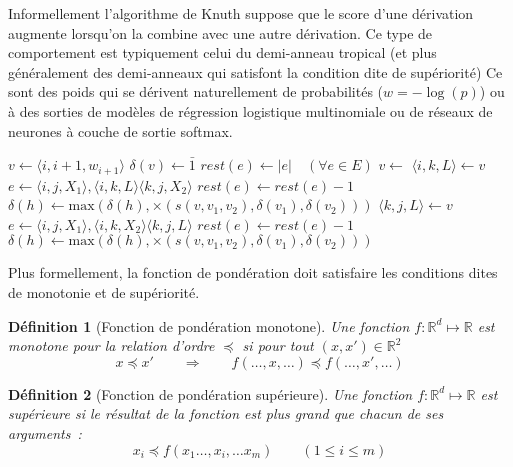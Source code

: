 \documentclass[11pt,openany]{book}
\newtheorem{definition}{Définition}[chapter]
\begin{document}
Informellement l'algorithme de Knuth suppose que le score d'une dérivation augmente lorsqu'on la combine avec une autre dérivation.
Ce type de comportement est typiquement celui du demi-anneau tropical (et plus généralement des demi-anneaux qui satisfont 
la condition dite de supériorité)
Ce sont des poids qui se dérivent naturellement de probabilités 
($w = -\log(p)$) ou à des sorties de modèles de régression logistique multinomiale ou de réseaux de neurones
à couche de sortie softmax.

\begin{algorithm}[htbp]
\begin{algorithmic}
\State $v \gets \langle i,i+1,w_{i+1} \rangle$
\State $\delta(v) \gets \bar{1}$
\State  {}
\EndFor
\State   $rest(e) \gets |e| \quad (\forall e \in E)$ 
\State $v \gets $ 
\State $\langle i , k , L \rangle \gets v$
\State $e \gets \langle i,j , X_1 \rangle , \langle i , k , L \rangle \langle k , j , X_2 \rangle$
\State $rest(e) \gets rest(e) - 1$
\State $\delta(h) \gets \text{max}( \delta(h),  \times(s(v,v_1,v_2),\delta(v_1),\delta(v_2)))$
\State {}
\EndIf
\EndFor
\EndFor
\State $\langle k , j , L \rangle \gets v$
\State $e \gets \langle i,j , X_1 \rangle , \langle i , k , X_2 \rangle \langle k , j , L \rangle$
\State $rest(e) \gets rest(e) - 1$
\State $\delta(h) \gets \text{max}( \delta(h),  \times(s(v,v_1,v_2),\delta(v_1),\delta(v_2)))$
\State {}
\EndIf
\EndFor
\EndFor
\EndWhile
\EndFunction
\end{algorithmic}
\caption{\label{algo-knuth-verbose} Algorithme de Knuth (version binaire)}
\end{algorithm}


Plus formellement, la fonction de pondération doit satisfaire les conditions dites de monotonie et de supériorité.
\begin{definition}[Fonction de pondération monotone]
Une fonction $f: \mathbb{R}^d \mapsto \mathbb{R}$ est monotone pour la relation d'ordre $\preceq$ si pour tout $(x,x') \in \mathbb{R}^2$ 
\begin{displaymath}
x \preceq x' \qquad \Rightarrow\qquad f(\ldots,x,\ldots) \preceq f(\ldots,x',\ldots)
\end{displaymath}
\end{definition}
\begin{definition}[Fonction de pondération supérieure]
Une fonction $f: \mathbb{R}^d \mapsto \mathbb{R}$ est supérieure si le résultat de la fonction
est plus grand que chacun de ses arguments~:
\begin{displaymath}
x_i \preceq f(x_1 \ldots,x_i,\ldots x_m) \qquad (1\leq i \leq m )
\end{displaymath}
\end{definition}
\end{document}
